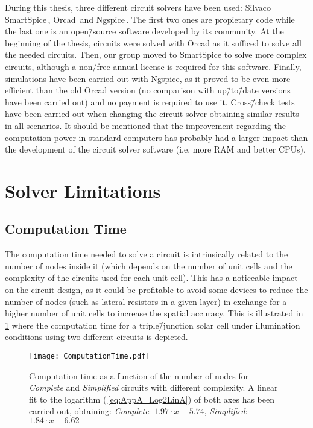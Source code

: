 During this thesis, three different circuit solvers have been used: Silvaco SmartSpice\,\cite{SmartSpice2017}, Orcad\,\cite{Orcad} and Ngspice\,\cite{Ngspice30}. The first two ones are propietary code while the last one is an open\=/source software developed by its community. At the beginning of the thesis, circuits were solved with Orcad as it sufficed to solve all the needed circuits. Then, our group moved to SmartSpice to solve more complex circuits, although a non\=/free annual license is required for this software. Finally, simulations have been carried out with Ngspice, as it proved to be even more efficient than the old Orcad version (no comparison with up\=/to\=/date versions have been carried out) and no payment is required to use it. Cross\=/check tests have been carried out when changing the circuit solver obtaining similar results in all scenarios. It should be mentioned that the improvement regarding the computation power in standard computers has probably had a larger impact than the development of the circuit solver software (i.e. more RAM and better CPUs).   

\section{Solver Limitations}\label{sec:Limitations}
\subsection{Computation Time}\label{subsec:AppA_ComputationTime}
The computation time needed to solve a circuit is intrinsically related to the number of nodes inside it (which depends on the number of unit cells and the complexity of the circuits used for each unit cell). This has a noticeable impact on the circuit design, as it could be profitable to avoid some devices to reduce the number of nodes (such as lateral resistors in a given layer) in exchange for a higher number of unit cells to increase the spatial accuracy. This is illustrated in \fig\,\ref{fig:AppA_ComputationTime} where the computation time for a triple\=/junction solar cell under illumination conditions using two different circuits is depicted. 

\begin{figure}
	\centering
	\texttt{[image: ComputationTime.pdf]}        
	\caption[Computation time (CPU and analysis) as a function of the number of nodes for two circuits with different complexity.]{Computation time as a function of the number of nodes for \textit{Complete} and \textit{Simplified} circuits with different complexity. A linear fit to the logarithm (\equ\,\ref{eq:AppA_Log2LinA}) of both axes has been carried out, obtaining: \textit{Complete}: $1.97 \cdot x-5.74$, \textit{Simplified}:$1.84 \cdot x-6.62$}
    \label{fig:AppA_ComputationTime} 
\end{figure}


